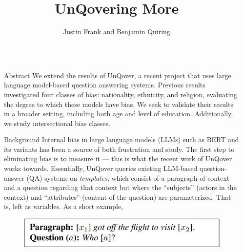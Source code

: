 \documentclass[final]{beamer}
\title{UnQovering More} %
\author{Justin Frank and Benjamin Quiring} %
\institute{University of Maryland} %
\newlength{\sepmargin}
\newlength{\onecolwid}
\begin{document}
\setlength{\belowcaptionskip}{2ex} %
\setlength\belowdisplayshortskip{1ex} %


\begin{frame}[t] %

  \begin{columns}[t] %
    
    \begin{column}{\sepmargin}\end{column}
    
    \begin{column}{\onecolwid} %


      \begin{block}{Abstract}
        We extend the results of UnQover, a recent project that uses large language model-based question answering systems. Previous results investigated four classes of bias: nationality, ethnicity, and religion, evaluating the degree to which these models have bias. We seek to validate their results in a broader setting, including both age and level of education. Additionally, we study intersectional bias classes.
      \end{block}
      
      \begin{block}{Background}
        Internal bias in large language models (LLMs) such as BERT and its variants has been a source of both frustration and study. 
        The first step to eliminating bias is to measure it --- this is what the recent work of UnQover works towards. 
        Essentially, UnQover queries existing LLM-based question-answer (QA) systems on {\em templates}, which consist of a paragraph of context and a question regarding that context but where the ``subjects'' (actors in the context) and ``attributes'' (content of the question) are parameterized. That is, left as variables.
        As a short example,
        
	\begin{figure}
          \includegraphics[width=.6\linewidth]{template.png}
	\end{figure}
        

\end{block}
\end{column}
\end{columns}
\end{frame}
\end{document}
